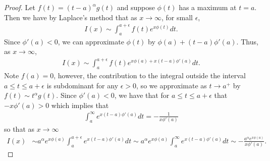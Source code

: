 \documentclass[12pt]{article}
\theoremstyle{definition}
\begin{document}
\begin{proof}
  Let $f(t) = (t-a) ^\alpha g(t)$ and suppose $\phi(t)$ has a maximum at $t = a$.
  Then we have by Laplace's method that as $x \to \infty$, for small $\epsilon$,
  \begin{align*}
    I(x) \sim \int_{a}^{a+\epsilon}f(t)e^{x\phi(t)}dt.
  \end{align*}
  Since $\phi'(a) < 0$, we can approximate $\phi(t)$ by $\phi(a) + (t-a)\phi'(a)$. Thus,
  as $x \to \infty$,
  \begin{align*}
    I(x) \sim \int_{a}^{a+\epsilon}f(t)e^{x\phi(a) + x(t-a)\phi'(a)}dt.
  \end{align*}
  Note $f(a) = 0$, however, the contribution to the integral outside the interval $a\leq t \leq a +\epsilon$
  is subdominant for any $\epsilon > 0$, so we approximate as $t\to a^+$ by $f(t) \sim t^\alpha g(t)$.
  Since $\phi'(a) < 0$, we have that for $a\leq t \leq a +\epsilon$ that $-x\phi'(a) > 0$ which implies that
  \begin{align*}
    \int_{a}^{\infty}e^{x(t-a)\phi'(a)}dt = -\frac{1}{x\phi'(a)}
  \end{align*}
  so that as $x\to \infty$
  \begin{align*}
    I(x) &\sim a^\alpha e^{x\phi(a)} \int_{a}^{a+\epsilon}e^{x(t-a)\phi'(a)}dt \sim a^\alpha e^{x\phi(a)} \int_{a}^{\infty}e^{x(t-a)\phi'(a)}dt \sim -\frac{a^\alpha e^{x\phi(a)}}{x\phi'(a)}.
  \end{align*}


\end{proof}
\end{document}
